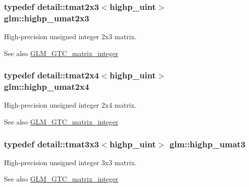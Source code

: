 \subsubsection[{highp\+\_\+umat2x3}]{\setlength{\rightskip}{0pt plus 5cm}typedef detail\+::tmat2x3$<$highp\+\_\+uint$>$ {\bf glm\+::highp\+\_\+umat2x3}}\label{group__gtc__matrix__integer_ga423c173624bfed5e27073987eecf06c2}
High-\/precision unsigned integer 2x3 matrix. \begin{DoxySeeAlso}{See also}
\hyperlink{group__gtc__matrix__integer}{G\+L\+M\+\_\+\+G\+T\+C\+\_\+matrix\+\_\+integer} 
\end{DoxySeeAlso}
\hypertarget{group__gtc__matrix__integer_ga6989ecc7d0dda60f3c9c9465e9243a78}{}
\subsubsection[{highp\+\_\+umat2x4}]{\setlength{\rightskip}{0pt plus 5cm}typedef detail\+::tmat2x4$<$highp\+\_\+uint$>$ {\bf glm\+::highp\+\_\+umat2x4}}\label{group__gtc__matrix__integer_ga6989ecc7d0dda60f3c9c9465e9243a78}
High-\/precision unsigned integer 2x4 matrix. \begin{DoxySeeAlso}{See also}
\hyperlink{group__gtc__matrix__integer}{G\+L\+M\+\_\+\+G\+T\+C\+\_\+matrix\+\_\+integer} 
\end{DoxySeeAlso}
\hypertarget{group__gtc__matrix__integer_ga0d2f0c76700809151e4582977bdc4c1d}{}
\subsubsection[{highp\+\_\+umat3}]{\setlength{\rightskip}{0pt plus 5cm}typedef detail\+::tmat3x3$<$highp\+\_\+uint$>$ {\bf glm\+::highp\+\_\+umat3}}\label{group__gtc__matrix__integer_ga0d2f0c76700809151e4582977bdc4c1d}
High-\/precision unsigned integer 3x3 matrix. \begin{DoxySeeAlso}{See also}
\hyperlink{group__gtc__matrix__integer}{G\+L\+M\+\_\+\+G\+T\+C\+\_\+matrix\+\_\+integer} 
\end{DoxySeeAlso}
\hypertarget{group__gtc__matrix__integer_gae054a2e2dcecb6d435acc15a25d53ba5}{}
